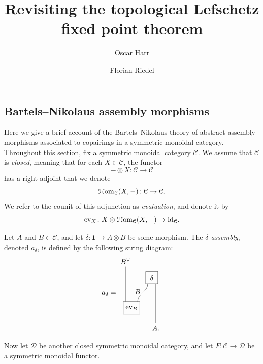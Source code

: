 \documentclass[english]{article}
\title{Revisiting the topological Lefschetz fixed point theorem}
\author{Oscar Harr \and Florian Riedel}
\numberwithin{equation}{section}
\begin{document}
\maketitle

\tableofcontents

\subsection{Bartels--Nikolaus assembly morphisms}

Here we give a brief account of the Bartels--Nikolaus theory of abstract assembly morphisms associated to copairings in a symmetric monoidal category. Throughout this section, fix a symmetric monoidal category $\mathcal C$. We assume that $\mathcal C$ is {\em closed}, meaning that for each $X\in\mathcal C$, the functor
$$
{-}\otimes X\colon\mathcal C\to\mathcal C
$$
has a right adjoint that we denote
$$
\operatorname{\mathcal{H}om}_{\mathcal C}(X,{-})\colon\mathcal C\to\mathcal C.
$$
We refer to the counit of this adjunction as {\em evaluation}, and denote it by
$$
\mathrm{ev}_X\colon X\otimes\operatorname{\mathcal{H}om}_{\mathcal C}(X,{-})\to\text{id}_{\mathcal C}.
$$
\begin{defn}
  Let $A$ and $B\in\mathcal C$, and let $\delta\colon\mathbf 1\to A\otimes B$ be some morphism. The {\em $\delta$-assembly}, denoted $a_{\delta}$, is defined by the following string diagram:
  \begin{equation*}
    \label{eq:assembly}
    a_\delta =
\begin{tikzpicture}[baseline=(current bounding box.center)]
  \node (Bvee) at (-0.3,3.3) {$B^\vee$};
  \node (deltabox) at (1,2.5) [rectangle, draw, minimum width=0.6cm, minimum height=0.6cm] {$\delta$};
  \node (evbox) at (0,1) [rectangle, draw, minimum width=0.6cm, minimum height=0.6cm] {$\mathrm{ev}_B$};
  \node (A) at (1.2,0) {$A$.};
  \node (B) at (0.3,1.8) {$B$};

  \draw (Bvee) -- (evbox.north -| -0.3,1.3);
  \draw (deltabox.south -| 0.8,2.5) to [out=270,in=90] (evbox.north -| 0.3,1.3);
  \draw (deltabox.south -| 1.2,2.5) -- (A);
  \end{tikzpicture}
\end{equation*}
\end{defn}
Now let $\mathcal D$ be another closed symmetric monoidal category, and let $F\colon\mathcal C\to\mathcal D$ be a symmetric monoidal functor.
\end{document}
